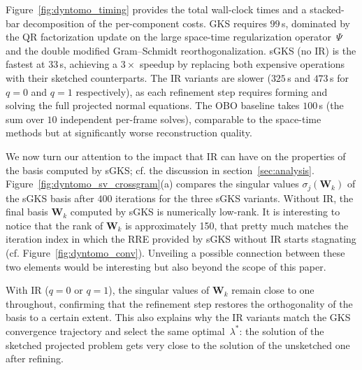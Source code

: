 \documentclass[%
  a4paper,
  onecolumn,
  colorlinks,
]{preprint}
\theoremstyle{plain}
\theoremstyle{definition}
\newcommand{\bW}{\ensuremath{\boldsymbol{W}}}
\begin{document}
Figure~\ref{fig:dyntomo_timing} provides the total wall-clock times
and a stacked-bar decomposition of the per-component costs. GKS requires $99$\,s, dominated by the QR factorization update on   the large space-time regularization operator~$\Psi$ and the double  modified Gram--Schmidt reorthogonalization.                       sGKS (no IR) is the fastest at $33$\,s, achieving a $3\times$ speedup by replacing both expensive operations with their sketched  counterparts. The IR variants are slower ($325$\,s and $473$\,s for $q = 0$ and $q = 1$ respectively), as each refinement step requires forming and solving the full projected normal equations. The OBO baseline takes $100$\,s (the sum over $10$ independent per-frame solves), comparable to the space-time methods but at significantly worse reconstruction quality.  

We now turn our attention to the impact that IR can have on the properties of the basis computed by sGKS; cf. the discussion in section~\ref{sec:analysis}.
Figure~\ref{fig:dyntomo_sv_crossgram}(a) compares the singular values
$\sigma_j(\bW_k)$ of the sGKS basis after $400$ iterations for the
three sGKS variants.
Without IR, the final basis $\bW_k$ computed by sGKS is numerically low-rank. It is interesting to notice that the rank of $\bW_k$ is approximately 150, that pretty much matches the iteration index in which the RRE provided by sGKS without IR starts stagnating (cf. Figure~\ref{fig:dyntomo_conv}). Unveiling a possible connection between these two elements would be interesting but also beyond the scope of this paper.  

With IR ($q = 0$ or $q = 1$), the singular values of $\bW_k$ remain close to
one throughout, confirming that the refinement step restores the
orthogonality of the basis to a certain extent.
This also explains why the IR variants match the GKS convergence
trajectory and select the same optimal~$\lambda^*$: the solution of the sketched projected problem
gets very close to the solution of the unsketched one after refining.
\end{document}

